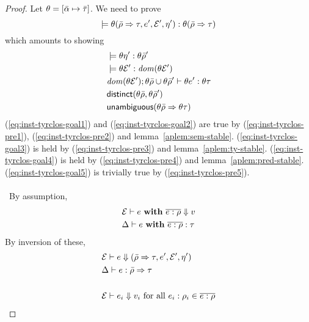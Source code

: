 \begin{proof}
  Let $\theta = [\bar{\alpha} \mapsto \bar{\tau}]$. We need to prove
  \begin{equation*}
    \models 
    \theta (\bar{\rho} \Rightarrow \tau,
        e', \mathcal{E}', \eta'):\theta (\bar{\rho} \Rightarrow \tau)
  \end{equation*}
  which amounts to showing 
  \begin{align}
    \label{eq:inst-tyrclos-goal1}
    & \models \theta \eta':\theta \bar{\rho}' \\
    \label{eq:inst-tyrclos-goal2}
    & \models \theta \mathcal{E}':{\it dom }(\theta \mathcal{E}') \\
    \label{eq:inst-tyrclos-goal3}
    & {\it dom }(\theta \mathcal{E}'); \theta \bar{\rho} \cup 
    \theta \bar{\rho}' \vdash \theta e':\theta \tau \\
    \label{eq:inst-tyrclos-goal4}
    & {\sf distinct}(\theta \bar{\rho}, \theta \bar{\rho}') \\
    \label{eq:inst-tyrclos-goal5}
    & {\sf unambiguous}(\theta \bar{\rho} \Rightarrow \theta \tau)
  \end{align}
  (\ref{eq:inst-tyrclos-goal1}) and (\ref{eq:inst-tyrclos-goal2}) are
  true by (\ref{eq:inst-tyrclos-pre1}), (\ref{eq:inst-tyrclos-pre2})
  and lemma~\ref{aplem:sem-stable}. (\ref{eq:inst-tyrclos-goal3}) is
  held by (\ref{eq:inst-tyrclos-pre3}) and
  lemma~\ref{aplem:ty-stable}. (\ref{eq:inst-tyrclos-goal4}) is held by
  (\ref{eq:inst-tyrclos-pre4}) and
  lemma~\ref{aplem:pred-stable}. (\ref{eq:inst-tyrclos-goal5}) is
  trivially true by (\ref{eq:inst-tyrclos-pre5}).
  \\
  \\
  \case \OpRApp~By assumption,
  \begin{align*}
    & \mathcal{E} \vdash e {\bf ~with~} \overline{e:\rho} \Downarrow v \\ 
    & \Delta \vdash e {\bf ~with~} \overline{e:\rho}:\tau
  \end{align*}
  By inversion of these,
  \begin{align}
    \label{eq:rapp-oprapp-pre1}
    & \tstate \turns e \eval 
    \rclos{\ruleset \To \type, e', \tstate', \rulepgmvar'} \\
    \label{eq:rapp-tyrapp-pre1}
    & \env \turns \relation{e}{\ruleset \To \type} \\ \nonumber \\
    \label{eq:rapp-oprapp-pre2}
    & \tstate \turns e_i \eval v_i  \text{~for all~}
    \relation{e_i}{\rulet_i} \in \rulesetexp \\

\end{align}
\end{proof}
